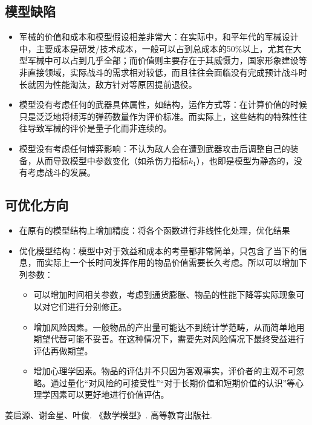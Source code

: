 \documentclass[UTF8]{mcmthesis}
\begin{document}
\subsection{模型缺陷}
\begin{itemize}
\item 军械的价值和成本和模型假设相差非常大：在实际中，和平年代的军械设计中，主要成本是研发/技术成本，一般可以占到总成本的50\%以上，尤其在大型军械中可以占到几乎全部；而价值则主要存在于其威慑力，国家形象建设等非直接领域，实际战斗的需求相对较低，而且往往会面临没有完成预计战斗时长就因为性能淘汰，敌方针对等原因提前退役。
\item 模型没有考虑任何的武器具体属性，如结构，运作方式等：在计算价值的时候只是泛泛地将倾泻的弹药数量作为评价标准。而实际上，这些结构的特殊性往往导致军械的评价是量子化而非连续的。
\item 模型没有考虑任何博弈影响：不认为敌人会在遭到武器攻击后调整自己的装备，从而导致模型中参数变化（如杀伤力指标$k_1$），也即是模型为静态的，没有考虑战斗的发展。
\end{itemize}

\subsection{可优化方向}
\begin{itemize}
\item 在原有的模型结构上增加精度：将各个函数进行非线性化处理，优化结果
\item 优化模型结构：模型中对于效益和成本的考量都非常简单，只包含了当下的信息，而实际上一个长时间发挥作用的物品价值需要长久考虑。所以可以增加下列参数：
\begin{itemize}
\item 可以增加时间相关参数，考虑到通货膨胀、物品的性能下降等实际现象可以对它们进行分别修正。
\item 增加风险因素。一般物品的产出量可能达不到统计学范畴，从而简单地用期望代替可能不妥善。在这种情况下，需要先对风险情况下最终受益进行评估再做期望。
\item 增加心理学因素。物品的评估并不只因为客观事实，评价者的主观不可忽略。通过量化“对风险的可接受性”“对于长期价值和短期价值的认识”等心理学因素可以更好地进行价值评估。
\end{itemize}
\end{itemize}
\begin{thebibliography}{123456} 
 姜启源、谢金星、叶俊. 《数学模型》. 高等教育出版社. 
\end{thebibliography}
\end{document}
